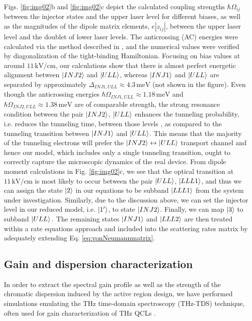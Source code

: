 \documentclass[10pt,letterpaper]{article}%
\begin{document}
Figs. \ref{fig:img02}b and \ref{fig:img02}c depict the calculated coupling
strengths $\hbar\Omega_{ij}$ between the injector states and the upper laser
level for different biases, as well as the magnitudes of the dipole matrix
elements, $e\left|  z_{ij}\right|  $, between the upper laser level and the
doublet of lower laser levels. The anticrossing (AC) energies were calculated via
the method described in \cite{bastardwave}, and the numerical values were
verified by diagonalization of the tight-binding Hamiltonian. Focusing on bias
values at around $11{\,}\mathrm{kV}/\mathrm{cm}$, our calculations show that
there is almost perfect energetic alignment between $\Ket{INJ2}\ $and
$\Ket{ULL}$, whereas $\Ket{INJ1}$ and $\Ket{ULL}$ are separated by
approximately $\Delta_{INJ1,ULL}\approx4.3{\,}\mathrm{meV}$ (not shown in the
figure). Even though the anticrossing energies $\hbar\Omega_{INJ1,ULL}%
\approx1.18{\,}\mathrm{meV}$ and $\hbar\Omega_{INJ2,ULL}\approx1.38{\,}%
\mathrm{meV}$ are of comparable strength, the strong resonance condition
between the pair $\Ket{INJ2}$, $\Ket{ULL}$ enhances the tunneling probability,
i.e. reduces the tunneling time, between those levels
\cite{williams2007terahertz}, as compared to the tunneling transition between
$\Ket{INJ1}$ and $\Ket{ULL}$. This means that the majority of the tunneling
electrons will prefer the $\Ket{INJ2}\leftrightarrow\Ket{ULL}$ transport
channel and hence our model, which includes only a single tunneling
transition, ought to correctly capture the microscopic dynamics of the real
device. From dipole moment calculations in Fig. \ref{fig:img02}c, we see that
the optical transition at $11{\,}\mathrm{kV}/\mathrm{cm}$ is most likely to
occur between the pair $\Ket{ULL}$, $\Ket{LLL1}$, and thus we can assign the
state $\Ket{2}$ in our equations to be subband $\Ket{LLL1}$ from the system
under investigation. Similarly, due to the discussion above, we can set the
injector level in our reduced model, i.e. $\Ket{1'}$, to state $\Ket{INJ2}$.
Finally, we can map $\Ket{3}$ to subband $\Ket{ULL}.$ The remaining states
$\Ket{INJ1}$ and $\Ket{LLL2}$ are then treated within a rate equations
approach and included into the scattering rates matrix by adequately extending
Eq. \ref{eq:vonNeumannmatrix}.

\subsection{Gain and dispersion characterization}

\label{subsec:numthztds} In order to extract the spectral gain profile as well
as the strength of the chromatic dispersion induced by the active region
design, we have performed simulations emulating the THz time-domain
spectroscopy (THz-TDS) technique, often used for gain characterization of THz
QCLs \cite{burghoff2014broadband,jukam2008gain,martl2011gain}.
\end{document}
